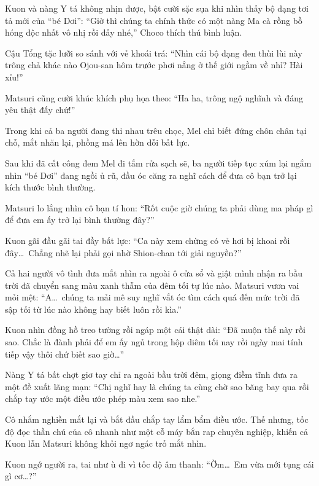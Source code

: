 \documentclass[../main.tex]{subfiles}
\begin{document}

Kuon và nàng Y tá không nhịn được, bật cười sặc sụa khi nhìn thấy bộ dạng tơi tả mới của ``bé Dơi'':
``Giờ thì chúng ta chính thức có một nàng Ma cà rồng bồ hóng độc nhất vô nhị rồi đấy nhé,'' Choco thích thú bình luận.

Cậu Tổng tặc lưỡi so sánh với vẻ khoái trá:
``Nhìn cái bộ dạng đen thùi lùi này trông chả khác nào Ojou-san hôm trước phơi nắng ở thế giới ngầm về nhỉ? Hài xỉu!''

Matsuri cũng cười khúc khích phụ họa theo:
``Ha ha, trông ngộ nghĩnh và đáng yêu thật đấy chứ!''

Trong khi cả ba người đang thi nhau trêu chọc, Mel chỉ biết đứng chôn chân tại chỗ, mắt nhăn lại, phồng má lên hờn dỗi bất lực.

\ct

Sau khi đã cất công đem Mel đi tắm rửa sạch sẽ, ba người tiếp tục xúm lại ngắm nhìn ``bé Dơi'' đang ngồi ủ rũ, đầu óc căng ra nghĩ cách để đưa cô bạn trở lại kích thước bình thường.

Matsuri lo lắng nhìn cô bạn tí hon:
``Rốt cuộc giờ chúng ta phải dùng ma pháp gì để đưa em ấy trở lại bình thường đây?''

Kuon gãi đầu gãi tai đầy bất lực:
``Ca này xem chừng có vẻ hơi bị khoai rồi đây\dots\ Chẳng nhẽ lại phải gọi nhờ Shion-chan tới giải nguyền?''

Cả hai người vô tình đưa mắt nhìn ra ngoài ô cửa sổ và giật mình nhận ra bầu trời đã chuyển sang màu xanh thẫm của đêm tối tự lúc nào. Matsuri vươn vai mỏi mệt:
``A\dots\ chúng ta mải mê suy nghĩ vắt óc tìm cách quá đến mức trời đã sập tối từ lúc nào không hay biết luôn rồi kìa.''

Kuon nhìn đồng hồ treo tường rồi ngáp một cái thật dài:
``Đã muộn thế này rồi sao. Chắc là đành phải để em ấy ngủ trong hộp diêm tối nay rồi ngày mai tính tiếp vậy thôi chứ biết sao giờ\dots''

Nàng Y tá bất chợt giơ tay chỉ ra ngoài bầu trời đêm, giọng điềm tĩnh đưa ra một đề xuất lãng mạn:
``Chị nghĩ hay là chúng ta cùng chờ sao băng bay qua rồi chắp tay ước một điều ước phép màu xem sao nhe.''

Cô nhắm nghiền mắt lại và bắt đầu chắp tay lẩm bẩm điều ước. Thế nhưng, tốc độ đọc thần chú của cô nhanh như một cỗ máy bắn rap chuyên nghiệp, khiến cả Kuon lẫn Matsuri không khỏi ngơ ngác trố mắt nhìn.


Kuon ngớ người ra, tai như ù đi vì tốc độ âm thanh:
``Ờm\dots\ Em vừa mới tụng cái gì cơ\dots?''
\end{document}
